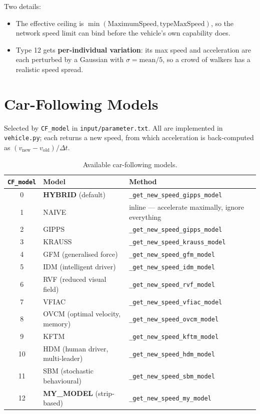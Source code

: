 \documentclass[11pt, a4paper]{article}
\newcommand{\code}[1]{\texttt{#1}}
\begin{document}
Two details:
\begin{itemize}
    \item The effective ceiling is
          $\min(\text{MaximumSpeed}, \text{typeMaxSpeed})$, so the network speed
          limit can bind before the vehicle's own capability does.
    \item Type 12 gets \textbf{per-individual variation}: its max speed and
          acceleration are each perturbed by a Gaussian with
          $\sigma = \text{mean}/5$, so a crowd of walkers has a realistic speed
          spread.
\end{itemize}

\section{Car-Following Models}
\label{sec:cf}

Selected by \code{CF\_model} in \code{input/parameter.txt}. All are implemented
in \code{vehicle.py}; each returns a new speed, from which acceleration is
back-computed as $(v_{\text{new}} - v_{\text{old}})/\Delta t$.

\begin{table}[h!]
\centering
\begin{tabular}{c l l}
\toprule
\textbf{\code{CF\_model}} & \textbf{Model} & \textbf{Method} \\
\midrule
0  & \textbf{HYBRID} (default)              & \code{\_get\_new\_speed\_gipps\_model} \\
1  & NAIVE                                  & inline --- accelerate maximally, ignore everything \\
2  & GIPPS                                  & \code{\_get\_new\_speed\_gipps\_model} \\
3  & KRAUSS                                 & \code{\_get\_new\_speed\_krauss\_model} \\
4  & GFM (generalised force)                & \code{\_get\_new\_speed\_gfm\_model} \\
5  & IDM (intelligent driver)               & \code{\_get\_new\_speed\_idm\_model} \\
6  & RVF (reduced visual field)             & \code{\_get\_new\_speed\_rvf\_model} \\
7  & VFIAC                                  & \code{\_get\_new\_speed\_vfiac\_model} \\
8  & OVCM (optimal velocity, memory)        & \code{\_get\_new\_speed\_ovcm\_model} \\
9  & KFTM                                   & \code{\_get\_new\_speed\_kftm\_model} \\
10 & HDM (human driver, multi-leader)       & \code{\_get\_new\_speed\_hdm\_model} \\
11 & SBM (stochastic behavioural)           & \code{\_get\_new\_speed\_sbm\_model} \\
12 & \textbf{MY\_MODEL} (strip-based)       & \code{\_get\_new\_speed\_my\_model} \\
\bottomrule
\end{tabular}
\caption{Available car-following models.}
\end{table}
\end{document}
